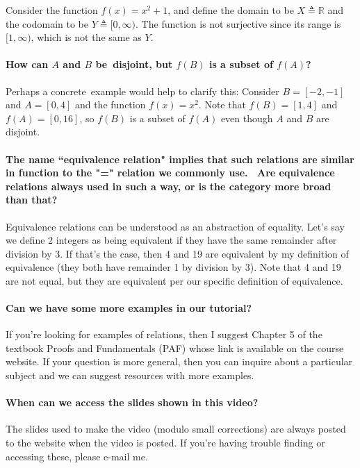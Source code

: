 \documentclass[10pt,english]{article}
\begin{document}
Consider the function $f(x) = x^2 + 1$, and define the domain to be $X \triangleq \mathbb{R}$ and the codomain to be $Y \triangleq [0,\infty)$. The function is not surjective since its range is $[1,\infty)$, which is not the same as $Y$.

\paragraph{How can $A$ and $B$ be disjoint, but $f(B)$ is a subset of $f(A)$?}

Perhaps a concrete example would help to clarify this: Consider $B= [-2,-1]$ and $A = [0,4]$ and the function $f(x) = x^2$.
Note that $f(B) = [1,4]$ and $f(A) = [0,16]$, so $f(B)$ is a subset of $f(A)$ even though $A$ and $B$ are disjoint.


\paragraph{The name ``equivalence relation" implies that such relations are similar in function to the "=" relation we commonly use.  Are equivalence relations always used in such a way, or is the category more broad than that?}

Equivalence relations can be understood as an abstraction of equality. Let's say we define 2 integers as being equivalent if they have the same remainder after division by 3. If that's the case, then 4 and 19 are equivalent by my definition of equivalence (they both have remainder 1 by division by 3). Note that 4 and 19 are not equal, but they are equivalent per our specific definition of equivalence.

\paragraph{Can we have some more examples in our tutorial? }

If you're looking for examples of relations, then I suggest Chapter 5 of the textbook Proofs and Fundamentals (PAF) whose link is available on the course website.  If your question is more general, then you can inquire about a particular subject and we can suggest resources with more examples.

\paragraph{When can we access the slides shown in this video?}

The slides used to make the video (modulo small corrections) are always posted to the website when the video is posted.  If you're having trouble finding or accessing these, please e-mail me.
\end{document}
